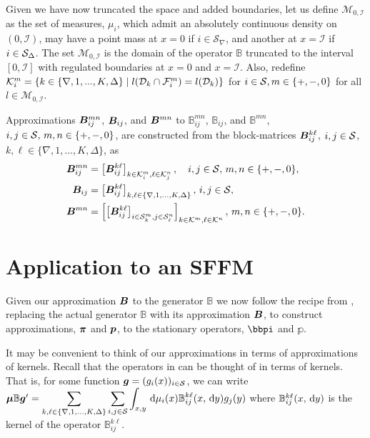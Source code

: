 Given we have now truncated the space and added boundaries, let us define \(\mathcal M_{0,\mathcal I}\) as the set of measures, \(\mu_i\), which admit an absolutely continuous density on \((0,\mathcal I)\), may have a point mass at \(x=0\) if \(i\in\mathcal S_\nabla\), and another at \(x=\mathcal I\) if \(i\in\mathcal{S}_{\Delta}\). The set \(\mathcal M_{0,\mathcal I}\) is the domain of the operator \(\mathbb B\) truncated to the interval \([0,\mathcal I]\) with regulated boundaries at \(x=0\) and \(x=\mathcal I\). Also, redefine \(\mathcal K^m_i = \{k\in\{\nabla,1,...,K,\Delta\}\mid   l  (\mathcal{D}_k\cap\mathcal{F}_i^m) =    l (\mathcal{D}_k) \}\) for \(i\in\mathcal{S},m\in\{+,-,0\}\) for all \(   l\in\mathcal M_{0,\mathcal I} \). 

Approximations \( \boldsymbol B^{mn}_{ij}\), \( \boldsymbol B_{ij}\), and \( \boldsymbol B^{mn}\) to \(\mathbb B^{mn}_{ij}\), \(\mathbb B_{ij}\), and \(\mathbb B^{mn}\), \(i,j\in\mathcal{S},\,m,n\in\{+,-,0\}\), are constructed from the block-matrices \({  \boldsymbol B}^{k\ell}_{ij}\), \(i,j\in\mathcal{S}\), \(k,\ell\in\{\nabla,1,\dots,K,\Delta\}\), as
\begin{align*}
	{  \boldsymbol B}_{ij}^{m n} &= \left[{  \boldsymbol B}_{ij}^{k \ell}\right]_{k\in\mathcal K_i^m,\ell\in\mathcal K_j^n},\quad i,j\in\mathcal{S},\,m,n\in\{+,-,0\},
\\	{  \boldsymbol B}_{ij} &= \left[{  \boldsymbol B}_{ij}^{k\ell}\right]_{k,\ell\in\{\nabla,1,...,K,\Delta\}},\,{i,j\in\mathcal{S}},
\\	{  \boldsymbol B}^{m n} &= \left[\left[{  \boldsymbol B}_{ij}^{k\ell}\right]_{i\in\mathcal{S}_k^m,j\in\mathcal{S}_\ell^n}\right]_{k\in\mathcal K^m,\ell\in\mathcal K^n},\,m,n\in\{+,-,0\}.
\end{align*}

\section{Application to an SFFM}\label{sec:DGSFFM}
Given our approximation \(\boldsymbol B\) to the generator \(\mathbb B\) we now follow the recipe from \citep{bo2014}, replacing the actual generator \(\mathbb B\) with its approximation \({  \boldsymbol B}\), to construct approximations, \(\boldsymbol \pi\) and \(\boldsymbol p\), to the stationary operators, \(\bbpi\) and \(\mathbb p\).

It may be convenient to think of our approximations in terms of approximations of kernels. Recall that the operators in \citep{bo2014} can be thought of in terms of kernels. That is, for some function \(\boldsymbol g = (g_i(x))_{i\in\mathcal{S}}\), we can write \(\boldsymbol \mu \mathbb B \boldsymbol g'{} = \displaystyle \sum\limits_{k,\ell\in\{\nabla,1,\dots,K,\Delta\}}\sum\limits_{i,j\in\mathcal{S}} \displaystyle \int_{x,y}\, \mathrm{d} \mu_i(x) \mathbb B_{ij}^{k\ell}(x,\, \mathrm{d} y)g_j(y)\) where \(\mathbb B_{ij}^{k\ell}(x,\, \mathrm{d} y)\) is the kernel of the operator \(\mathbb B_{ij}^{k\ell}\). 

